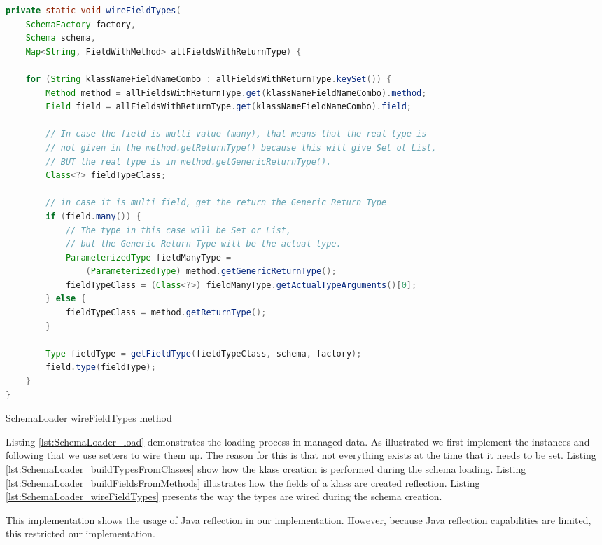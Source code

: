 \begin{sourcecode} [H]
	\begin{lstlisting}[language=Java, escapechar=|]
private static void wireFieldTypes(
	SchemaFactory factory,
	Schema schema,
	Map<String, FieldWithMethod> allFieldsWithReturnType) {

	for (String klassNameFieldNameCombo : allFieldsWithReturnType.keySet()) {
		Method method = allFieldsWithReturnType.get(klassNameFieldNameCombo).method;
		Field field = allFieldsWithReturnType.get(klassNameFieldNameCombo).field;

		// In case the field is multi value (many), that means that the real type is
		// not given in the method.getReturnType() because this will give Set ot List,
		// BUT the real type is in method.getGenericReturnType().
		Class<?> fieldTypeClass;

		// in case it is multi field, get the return the Generic Return Type
		if (field.many()) {
			// The type in this case will be Set or List,
			// but the Generic Return Type will be the actual type.
			ParameterizedType fieldManyType = 
				(ParameterizedType) method.getGenericReturnType();
			fieldTypeClass = (Class<?>) fieldManyType.getActualTypeArguments()[0];
		} else {
			fieldTypeClass = method.getReturnType();
		}

		Type fieldType = getFieldType(fieldTypeClass, schema, factory);
		field.type(fieldType);
	}
}
    \end{lstlisting}
	\caption{SchemaLoader wireFieldTypes method}
	\label{lst:SchemaLoader_wireFieldTypes}
\end{sourcecode}

Listing \ref{lst:SchemaLoader_load} demonstrates the loading process in managed data.
As illustrated we first implement the instances and following that we use setters to wire them up. 
The reason for this is that not everything exists at the time that it needs to be set.
Listing \ref{lst:SchemaLoader_buildTypesFromClasses} show how the klass creation is performed during the schema loading.
Listing \ref{lst:SchemaLoader_buildFieldsFromMethods} illustrates how the fields of a klass are created reflection.
Listing \ref{lst:SchemaLoader_wireFieldTypes} presents the way the types are wired during the schema creation.

This implementation shows the usage of Java reflection in our implementation.
However, because Java reflection capabilities are limited, this restricted our implementation.
